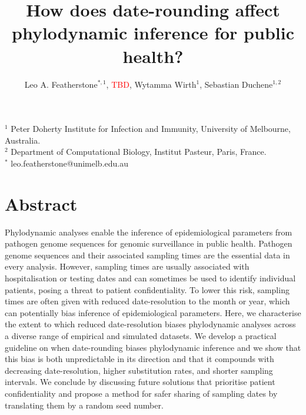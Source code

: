 \documentclass[12pt]{article}
\title{How does date-rounding affect phylodynamic inference for public health?}
\author{Leo A. Featherstone$^{\ast,1}$, \textcolor{red}{TBD}, Wytamma Wirth$^{1}$, Sebastian Duchene$^{1,2}$}
\begin{document}
\maketitle

\section*{}
\footnotesize
$^{1}$ Peter Doherty Institute for Infection and Immunity, University of Melbourne, Australia.\\
$^{2}$ Department of Computational Biology, Institut Pasteur, Paris, France.\\
$^{*}$ leo.featherstone@unimelb.edu.au

\linenumbers
\normalsize
\section*{Abstract}
 Phylodynamic analyses enable the inference of epidemiological parameters from pathogen genome sequences for genomic surveillance in public health. Pathogen genome sequences and their associated sampling times are the essential data in every analysis. However, sampling times are usually associated with hospitalisation or testing dates and can sometimes be used to identify individual patients, posing a threat to patient confidentiality. To lower this risk, sampling times are often given with reduced date-resolution to the month or year, which can potentially bias inference of epidemiological parameters. Here, we characterise the extent to which reduced date-resolution biases phylodynamic analyses across a diverse range of empirical and simulated datasets. We develop a practical guideline on when date-rounding biases phylodynamic inference and we show that this bias is both unpredictable in its direction and that it compounds with decreasing date-resolution, higher substitution rates, and shorter sampling intervals. We conclude by discussing future solutions that prioritise patient confidentiality and propose a method for safer sharing of sampling dates by translating them by a random seed number.
\end{document}
